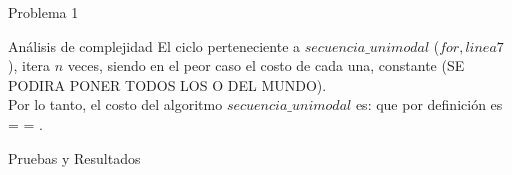 \begin{section}{Problema 1}
\begin{subsection}{Análisis de complejidad}
	El ciclo perteneciente a $secuencia\_unimodal$ ($for, linea 7$), itera $n$ veces, siendo en el peor caso el costo de cada una, constante (SE PODIRA PONER TODOS LOS O DEL MUNDO).\\

	Por lo tanto, el costo del algoritmo $secuencia\_unimodal$ es:  que por definición es  =  = . \\


	
		
	\end{subsection}


	\begin{subsection}{Pruebas y Resultados}

	\end{subsection}

\end{section}


